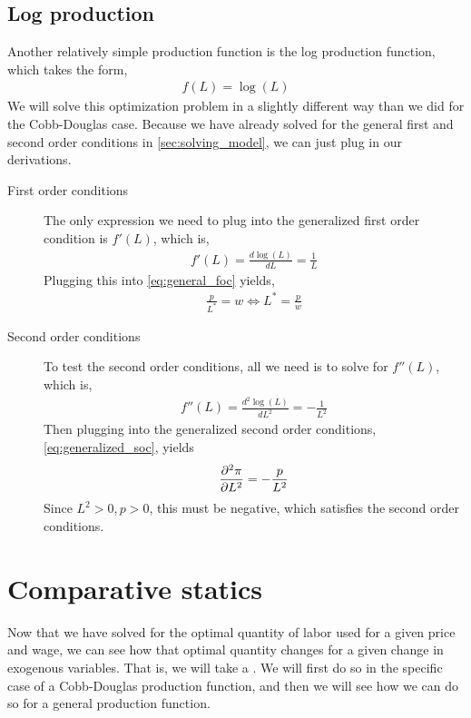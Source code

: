 \subsection*{Log production}
Another relatively simple production function is the log production function, which takes the form,
\begin{align}
    f(L) = \log(L)
\end{align}
We will solve this optimization problem in a slightly different way than we did for the Cobb-Douglas case. Because we have already solved for the general first and second order conditions in \ref{sec:solving_model}, we can just plug in our derivations.
\begin{description}
    \item[First order conditions] The only expression we need to plug into the generalized first order condition is $f'(L)$, which is,
    \begin{align*}
        f'(L) = \frac{d \log(L)}{dL} = \frac{1}{L}
    \end{align*} 
    Plugging this into \ref{eq:general_foc} yields,
    \begin{align*}
        \frac{p}{L^*} = w \iff L^* = \frac{p}{w}
    \end{align*}
    \item[Second order conditions] To test the second order conditions, all we need is to solve for $f''(L)$, which is,
    \begin{align*}
        f''(L) = \frac{d^2 \log(L)}{d L^2} = - \frac{1}{L^2}
    \end{align*}  
    Then plugging into the generalized second order conditions, \ref{eq:generalized_soc}, yields
    \begin{align}
        \frac{\partial ^2 \pi}{\partial L^2} = - \frac{p}{L^2}
    \end{align}
    Since $L^2 > 0, p > 0$, this must be negative, which satisfies the second order conditions. 
\end{description}

\section{Comparative statics}
Now that we have solved for the optimal quantity of labor used for a given price and wage, we can see how that optimal quantity changes for a given change in exogenous variables. That is, we will take a . We will first do so in the specific case of a Cobb-Douglas production function, and then we will see how we can do so for a general production function. 

